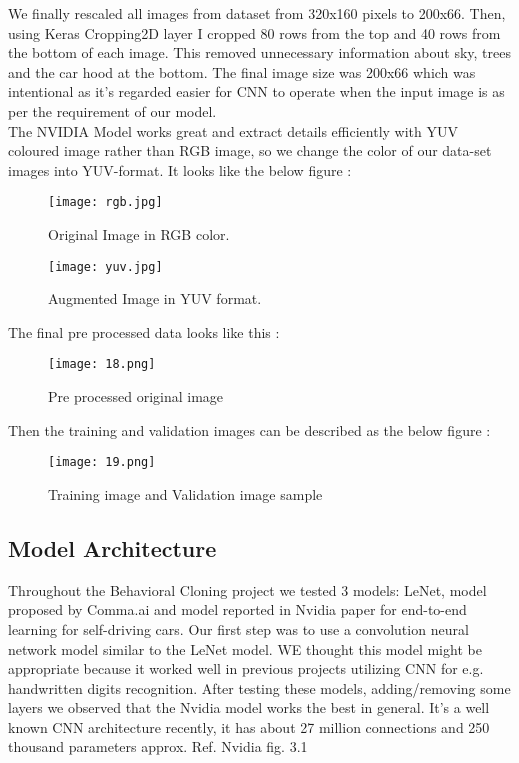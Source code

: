 We finally rescaled all images from dataset from 320x160 pixels to 200x66. Then, using Keras Cropping2D layer I cropped 80 rows from the top and 40 rows from the bottom of each image. This removed unnecessary information about sky, trees and the car hood at the bottom. The final image size was 200x66 which was intentional as it's regarded easier for CNN to operate when the input image is as per the requirement of our model.\\
The NVIDIA Model works great and extract details efficiently with YUV coloured image rather than RGB image, so we change the color of our data-set images into YUV-format. It looks like the below figure :
\begin{figure}[H]
	\centering
	\texttt{[image: rgb.jpg]}
	\caption{Original Image in RGB color.}
\end{figure} 
\begin{figure}[H]
	\centering
	\texttt{[image: yuv.jpg]}
	\caption{Augmented Image in YUV format.}
\end{figure}
The final pre processed data looks like this :
 \begin{figure}[H]
	\centering
	\texttt{[image: 18.png]}
	\caption{Pre processed original image}
\end{figure}
Then the training and validation images can be described as the below figure : \\
 \begin{figure}[H]
	\centering
	\texttt{[image: 19.png]}
	\caption{Training image and Validation image sample}
\end{figure}

\subsection{Model Architecture}
Throughout the Behavioral Cloning project we tested 3 models: LeNet, model proposed by Comma.ai and model reported in Nvidia paper for end-to-end learning for self-driving cars. Our first step was to use a convolution neural network model similar to the LeNet model. WE thought this model might be appropriate because it worked well in previous projects utilizing CNN for e.g. handwritten digits recognition. After testing these models, adding/removing some layers we observed that the Nvidia model works the best in general. It's a well known CNN architecture recently, it has about 27 million connections and 250 thousand parameters approx. Ref. Nvidia fig. 3.1

